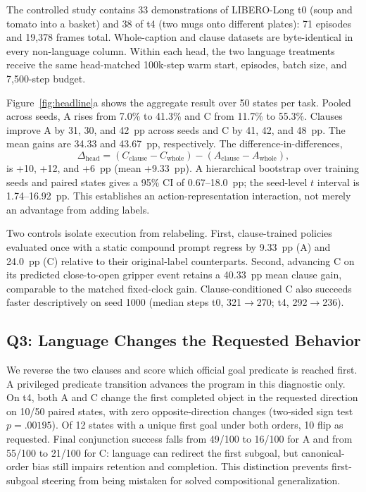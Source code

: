 The controlled study contains 33 demonstrations of LIBERO-Long t0 (soup and tomato into a basket) and 38 of t4 (two mugs onto different plates): 71 episodes and 19,378 frames total. Whole-caption and clause datasets are byte-identical in every non-language column. Within each head, the two language treatments receive the same head-matched 100k-step warm start, episodes, batch size, and 7,500-step budget.

Figure~\ref{fig:headline}a shows the aggregate result over 50 states per task. Pooled across seeds, A rises from 7.0\% to 41.3\% and C from 11.7\% to 55.3\%. Clauses improve A by 31, 30, and 42~pp across seeds and C by 41, 42, and 48~pp. The mean gains are 34.33 and 43.67~pp, respectively. The difference-in-differences,
\begin{equation}
  \Delta_{\mathrm{head}}=(C_{\mathrm{clause}}-C_{\mathrm{whole}})
       -(A_{\mathrm{clause}}-A_{\mathrm{whole}}),
\end{equation}
is +10, +12, and +6~pp (mean +9.33~pp). A hierarchical bootstrap over training seeds and paired states gives a 95\% CI of 0.67--18.0~pp; the seed-level $t$ interval is 1.74--16.92~pp. This establishes an action-representation interaction, not merely an advantage from adding labels.

Two controls isolate execution from relabeling. First, clause-trained policies evaluated once with a static compound prompt regress by 9.33~pp (A) and 24.0~pp (C) relative to their original-label counterparts. Second, advancing C on its predicted close-to-open gripper event retains a 40.33~pp mean clause gain, comparable to the matched fixed-clock gain. Clause-conditioned C also succeeds faster descriptively on seed 1000 (median steps t0, 321$\rightarrow$270; t4, 292$\rightarrow$236).

\subsection{Q3: Language Changes the Requested Behavior}

We reverse the two clauses and score which official goal predicate is reached first. A privileged predicate transition advances the program in this diagnostic only. On t4, both A and C change the first completed object in the requested direction on 10/50 paired states, with zero opposite-direction changes (two-sided sign test $p=.00195$). Of 12 states with a unique first goal under both orders, 10 flip as requested. Final conjunction success falls from 49/100 to 16/100 for A and from 55/100 to 21/100 for C: language can redirect the first subgoal, but canonical-order bias still impairs retention and completion. This distinction prevents first-subgoal steering from being mistaken for solved compositional generalization.

